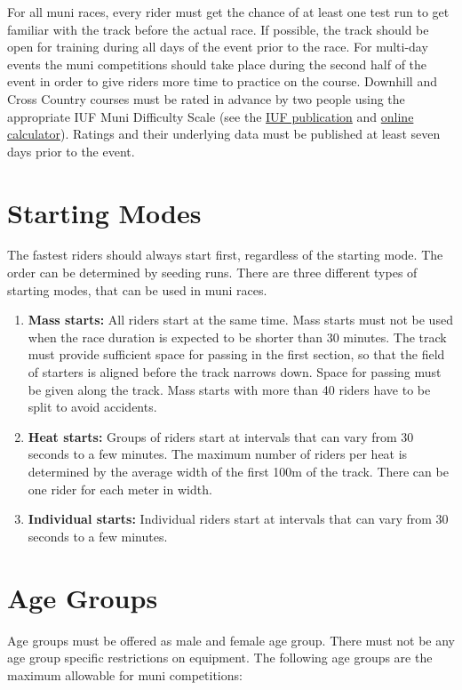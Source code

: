 For all muni races, every rider must get the chance of at least one test run to get familiar with the track before the actual race.
If possible, the track should be open for training during all days of the event prior to the race.
For multi-day events the muni competitions should take place during the second half of the event in order to give riders more time to practice on the course.
Downhill and Cross Country courses must be rated in advance by two people using the appropriate IUF Muni Difficulty Scale (see the \href{https://unicycling.org/files/iuf-muni-difficulty-scale.pdf}{IUF publication} and \href{https://muni-scale.info/}{online calculator}).
Ratings and their underlying data must be published at least seven days prior to the event.

\section{Starting Modes}
The fastest riders should always start first, regardless of the starting mode.
The order can be determined by seeding runs.
There are three different types of starting modes, that can be used in muni races.
\begin{enumerate}
\item \textbf{Mass starts:} All riders start at the same time.
Mass starts must not be used when the race duration is expected to be shorter than 30 minutes.
The track must provide sufficient space for passing in the first section, so that the field of starters is aligned before the track narrows down.
Space for passing must be given along the track.
Mass starts with more than 40 riders have to be split to avoid accidents.
\item \textbf{Heat starts:} Groups of riders start at intervals that can vary from 30 seconds to a few minutes.
The maximum number of riders per heat is determined by the average width of the first 100m of the track.
There can be one rider for each meter in width.
\item \textbf{Individual starts:} Individual riders start at intervals that can vary from 30 seconds to a few minutes.
\end{enumerate}

\section{Age Groups}
Age groups must be offered as male and female age group.
There must not be any age group specific restrictions on equipment.
The following age groups are the maximum allowable for muni competitions:

